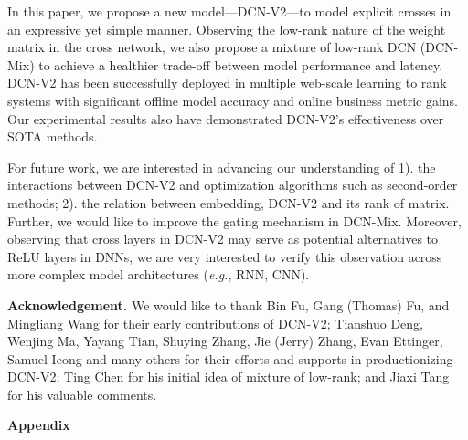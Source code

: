 \documentclass[sigconf]{acmart}
\begin{document}
In this paper, we propose a new model---{DCN-V2}---to model explicit crosses in an expressive yet simple manner. Observing the low-rank nature of the weight matrix in the cross network, we also propose a mixture of low-rank DCN ({DCN-Mix}) to achieve a healthier trade-off between model performance and latency. {DCN-V2} has been successfully deployed in multiple web-scale learning to rank systems with significant offline model accuracy and online business metric gains. Our experimental results also have demonstrated {DCN-V2}'s effectiveness over SOTA methods.



For future work, we are interested in advancing our understanding of 1). the interactions between {DCN-V2} and optimization algorithms such as second-order methods; 2). the relation between embedding, {DCN-V2} and its rank of matrix. Further, we would like to improve the gating mechanism in {DCN-Mix}. Moreover, observing that cross layers in {DCN-V2} may serve as potential alternatives to ReLU layers in DNNs, we are very interested to verify this observation across more complex model architectures (\emph{e.g.}, RNN, CNN).

  
\medskip
{\bf Acknowledgement.} We would like to thank Bin Fu, Gang (Thomas) Fu, and Mingliang Wang for their early contributions of {DCN-V2}; Tianshuo Deng, Wenjing Ma, Yayang Tian, Shuying Zhang, Jie (Jerry) Zhang, Evan Ettinger, Samuel Ieong and many others for their efforts and supports in productionizing {DCN-V2}; Ting Chen for his initial idea of mixture of low-rank; and Jiaxi Tang for his valuable comments.




\clearpage
{\LARGE \bf Appendix}
\setlength{\belowdisplayskip}{0pt} \setlength{\belowdisplayshortskip}{0pt}
\setlength{\abovedisplayskip}{0pt} \setlength{\abovedisplayshortskip}{0pt}
\allowdisplaybreaks
\end{document}

